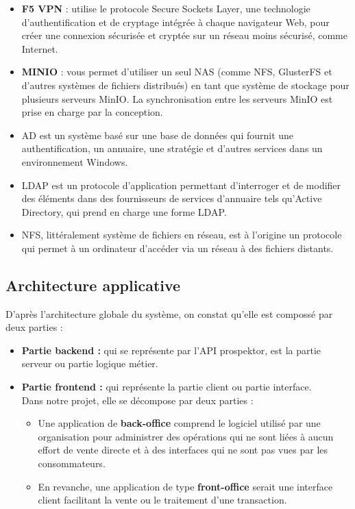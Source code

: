 \begin{itemize}
\item \textbf{F5 VPN} : utilise le protocole Secure Sockets Layer, une technologie d'authentification et de cryptage int\'egr\'ee \`a chaque navigateur Web, pour cr\'eer une connexion s\'ecuris\'ee et crypt\'ee sur un r\'eseau moins s\'ecuris\'e, comme Internet.
\item \textbf{MINIO} : vous permet d'utiliser un seul \gls{NAS} (comme \gls{NFS}, GlusterFS et d'autres syst\`emes de fichiers distribu\'es) en tant que syst\`eme de stockage pour plusieurs serveurs MinIO. La synchronisation entre les serveurs MinIO est prise en charge par la conception.
\item \gls{AD} est un syst\`eme bas\'e sur une base de donn\'ees qui fournit une authentification, un annuaire, une strat\'egie et d'autres services dans un environnement Windows.
\item \gls{LDAP} est un protocole d'application permettant d'interroger et de modifier des \'el\'ements dans des fournisseurs de services d'annuaire tels qu'Active Directory, qui prend en charge une forme LDAP.
\item \gls{NFS}, litt\'eralement système de fichiers en r\'eseau, est \`a l'origine un protocole qui permet \`a un ordinateur d'acc\'eder via un r\'eseau \`a des fichiers distants.
\end{itemize}

\subsection{Architecture applicative} 

D'apr\`es l'architecture globale du syst\`eme, on constat qu'elle est composs\'e par deux parties :

\begin{itemize}
\item \textbf{Partie backend :} qui se repr\'esente par l'API prospektor, est la partie serveur ou partie logique m\'etier.
\item \textbf{Partie frontend :} qui repr\'esente la partie client ou partie interface.\\
Dans notre projet, elle se d\'ecompose par deux parties :
\begin{itemize}
\item Une application de \textbf{back-office} comprend le logiciel utilis\'e par une organisation pour administrer des op\'erations qui ne sont li\'ees \`a aucun effort de vente directe et \`a des interfaces qui ne sont pas vues par les consommateurs.
\item En revanche, une application de type \textbf{front-office} serait une interface client facilitant la vente ou le traitement d'une transaction.
\end{itemize}
\end{itemize}



